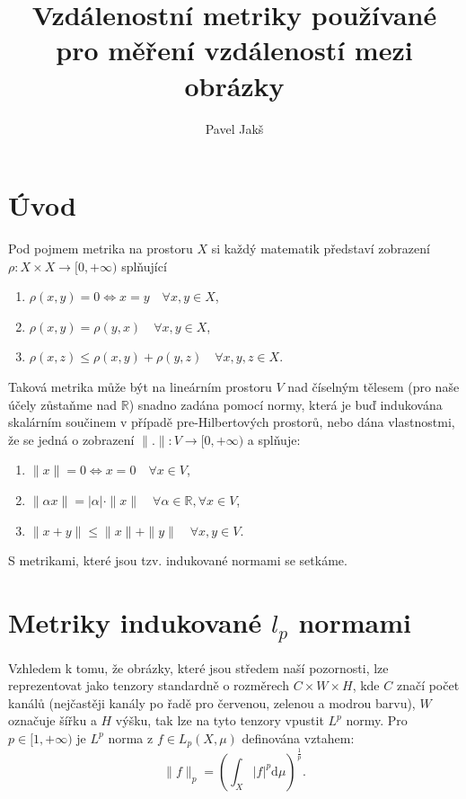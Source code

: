 \documentclass[czech]{article}
\author{Pavel Jakš}
\title{Vzdálenostní metriky používané pro měření vzdáleností mezi obrázky}
\begin{document}
\maketitle

\section*{Úvod}

Pod pojmem metrika na prostoru $X$ si každý matematik představí zobrazení $\rho : X \times X \rightarrow [0, + \infty)$
splňující
\begin{enumerate}
    \item $\rho(x, y) = 0 \iff x = y \quad \forall x, y \in X$,
    \item $\rho(x, y) = \rho(y, x) \quad \forall x, y \in X$,
    \item $\rho(x, z) \leq \rho(x, y) + \rho(y, z) \quad \forall x, y, z \in X$.
\end{enumerate}

Taková metrika může být na lineárním prostoru $V$ nad číselným tělesem (pro naše účely zůstaňme nad $\mathbb{R}$)
snadno zadána pomocí normy,
která je buď indukována skalárním součinem v případě pre-Hilbertových prostorů,
nebo dána vlastnostmi, že se jedná o zobrazení $\|.\| : V \rightarrow [0, + \infty)$
a splňuje:
\begin{enumerate}
    \item $\|x\| = 0 \iff x = 0 \quad \forall x \in V$,
    \item $\|\alpha x\| = |\alpha| \cdot \|x\| \quad \forall \alpha \in \mathbb{R}, \forall x \in V$,
    \item $\|x + y\| \leq \|x\| + \|y\| \quad \forall x, y \in V$.
\end{enumerate}
S metrikami, které jsou tzv. indukované normami se setkáme.


\section{Metriky indukované $l_p$ normami}

Vzhledem k tomu, že obrázky, které jsou středem naší pozornosti,
lze reprezentovat jako tenzory standardně o rozměrech $C \times W \times H$,
kde $C$ značí počet kanálů (nejčastěji kanály po řadě pro červenou, zelenou a modrou barvu),
$W$ označuje šířku a $H$ výšku, tak lze na tyto tenzory vpustit $L^p$ normy.
Pro $p \in [1, + \infty)$ je $L^p$ norma z $f \in L_p(X, \mu )$
definována vztahem:
\begin{equation*}
    \|f\|_p = \left(\int_X |f|^p \mathrm{d} \mu \right)^{\frac{1}{p}}.
\end{equation*}
\end{document}

